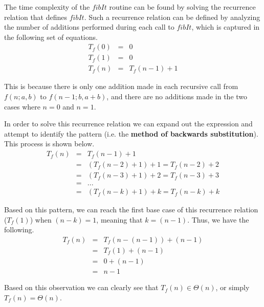 \documentclass[11pt]{article}
\begin{document}
\begin{prob}{2}
\end{prob}
\begin{sol}

The time complexity of the $fibIt$ routine can be found by solving the recurrence relation that defines $fibIt$. Such a recurrence relation can be defined by analyzing the number of additions performed during each call to $fibIt$, which is captured in the following set of equations.
\begin{eqnarray*}
T_{f}(0) & = & 0 \\
T_{f}(1) & = & 0 \\
T_{f}(n) & = & T_{f}(n-1) + 1
\end{eqnarray*}

This is because there is only one addition made in each recursive call from $f(n;a,b)$ to $f(n-1;b,a+b)$, and there are no additions made in the two cases where $n = 0$ and $n = 1$.

In order to solve this recurrence relation we can expand out the expression and attempt to identify the pattern (i.e. the \textbf{method of backwards substitution}). This process is shown below.
\begin{eqnarray*}
T_{f}(n) & = & T_{f}(n - 1) + 1 \\
& = & (T_{f}(n - 2) + 1) + 1 = T_{f}(n - 2) + 2 \\
& = & (T_{f}(n - 3) + 1) + 2 = T_{f}(n - 3) + 3 \\
& = & ... \\
& = & (T_{f}(n - k) + 1) + k = T_{f}(n - k) + k
\end{eqnarray*}

Based on this pattern, we can reach the first base case of this recurrence relation ($T_{f}(1)$) when $(n - k) = 1$, meaning that $k = (n - 1)$. Thus, we have the following.
\begin{eqnarray*}
T_{f}(n) & = & T_{f}(n - (n - 1)) + (n - 1)  \\
& = & T_{f}(1) + (n - 1) \\
& = & 0 + (n - 1) \\
& = & n - 1
\end{eqnarray*}

Based on this observation we can clearly see that $T_{f}(n) \in \Theta(n)$, or simply $T_{f}(n) = \Theta(n)$. 




\end{sol}
\end{document}
